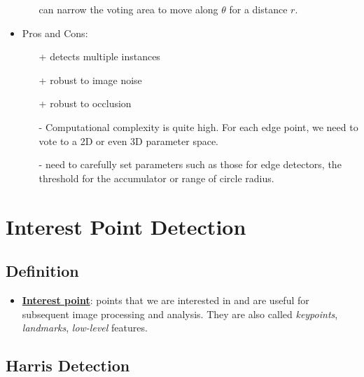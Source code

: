 \documentclass[twocolumn,landscape,10pt]{article}
\theoremstyle{definition}
\begin{document}
\begin{itemize}
\begin{itemize}
                can narrow the voting area to move along $\theta$ for a distance
                $r$.
        \end{itemize} 
    \item Pros and Cons:
        \begin{itemize}
            \item[+] detects multiple instances
            \item[+] robust to image noise
            \item[+] robust to occlusion
            \item[-] Computational complexity is quite high. For each edge
                point, we need to vote to a 2D or even 3D parameter space.
            \item[-] need to carefully set parameters such as those for edge
                detectors, the threshold for the accumulator or range of circle
                radius.
        \end{itemize} 
\end{itemize} 


\section{Interest Point Detection}

\subsection{Definition}

\begin{itemize}
    \item \underline{\textbf{Interest point}}: points that we are interested in
        and are useful for subsequent image processing and analysis.
        They are also called \emph{keypoints}, \emph{landmarks},
        \emph{low-level} features.
\end{itemize} 

\subsection{Harris Detection}\label{harris detector}
\end{document}
